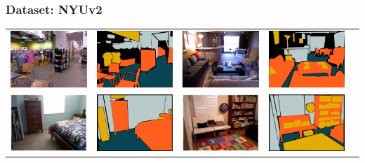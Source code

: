 \documentclass[final,ignorenonframetext,compress]{beamer}
\begin{document}
\begin{frame}
    \frametitle{Dataset: NYUv2}
    \begin{tabularx}{\linewidth}{@{\extracolsep{\fill}}ccccc}

        \includegraphics[width=.22\textwidth]{images/00118_image.png}&%
        \includegraphics[width=.22\linewidth]{images/00118_gt.png}&
        \includegraphics[width=.22\textwidth]{images/01203_image.png}&%
        \includegraphics[width=.22\linewidth]{images/01203_gt.png}\\

        \includegraphics[width=.22\textwidth]{images/01147_image.png}&%
        \includegraphics[width=.22\linewidth]{images/01147_gt.png}&
        \includegraphics[width=.22\textwidth]{images/00281_image.png}&%
        \includegraphics[width=.22\linewidth]{images/00281_gt.png}\\


\end{tabularx}
\end{frame}
\end{document}
